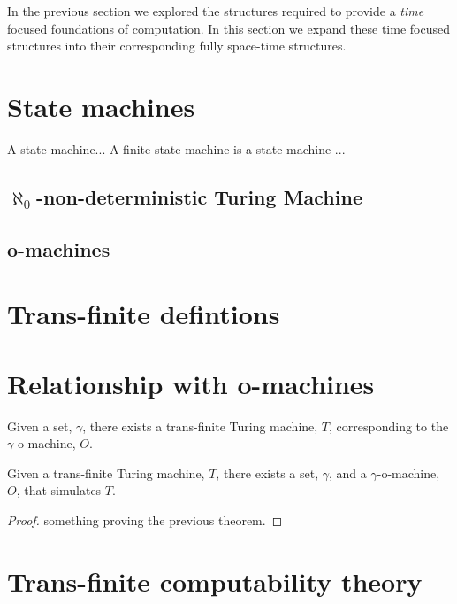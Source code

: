 \documentclass[a4paper]{amsart}
\begin{document}
In the previous section we explored the structures required to provide a \emph{time} focused 
foundations of computation. In this section we expand these time focused structures into 
their corresponding fully space-time structures.

\section{State machines}

\begin{definition}

A state machine... A finite state machine is a state machine ...

\end{definition}

\subsection{$\aleph_0$-non-deterministic Turing Machine}

\subsection{o-machines}

\section{Trans-finite defintions}

\section{Relationship with o-machines}

\begin{theorem}

Given a set, $\gamma$, there exists a trans-finite Turing machine, $T$, corresponding to
the $\gamma$-o-machine, $O$.

\end{theorem}


\begin{theorem}

Given a trans-finite Turing machine, $T$, there exists a set, $\gamma$, and a
$\gamma$-o-machine, $O$, that simulates $T$.

\end{theorem}

\begin{proof}
something proving the previous theorem.
\end{proof}

\section{Trans-finite computability theory}




\end{document}
